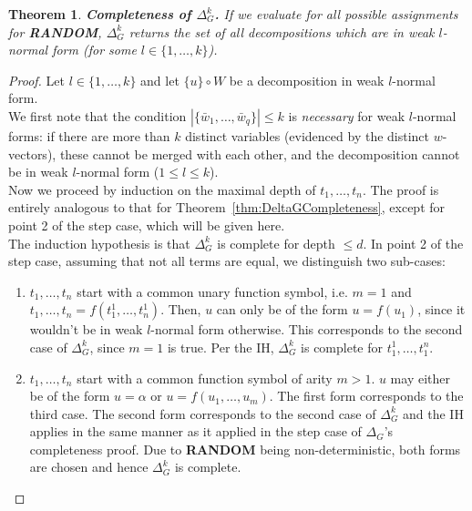 \documentclass[a4paper, 11pt]{report}
\newtheorem{theorem}{Theorem}
\begin{document}
\begin{theorem}
\textbf{Completeness of $\Delta_G^k$.}
If we evaluate for all possible assignments for \textbf{RANDOM}, $\Delta_G^k$ returns the set of all decompositions which are in weak $l$-normal form (for some $l \in \{1,\dots,k\}$).
\label{thm:DeltaGkCompletenss}
\end{theorem}

\begin{proof}
Let $l \in \{1,\dots,k\}$ and let $\{u\} \circ W$ be a decomposition in weak $l$-normal form.\\

We first note that the condition $|\{\bar{w}_1,\dots,\bar{w}_q\}| \leq k$ is {\em necessary} for weak $l$-normal forms: if there are more than $k$ distinct variables (evidenced by the distinct $w$-vectors), these cannot be merged with each other, and the decomposition cannot be in weak $l$-normal form ($1 \leq l \leq k$).\\

Now we proceed by induction on the maximal depth of $t_1,\dots,t_n$. The proof is entirely analogous to that for Theorem~\ref{thm:DeltaGCompleteness}, except for point 2 of the step case, which will be given here.\\

\noindent
The induction hypothesis is that $\Delta_G^k$ is complete for depth $\leq d$. In point 2 of the step case, assuming that not all terms are equal, we distinguish two sub-cases:
  \begin{enumerate}
    \item $t_1,\dots,t_n $ start with a common unary function symbol, i.e. $m = 1$ and $t_1,\dots,t_n = f(t_1^1,\dots,t_n^1)$. Then, $u$ can only be of the form $u=f(u_1)$, since it wouldn't be in weak $l$-normal form otherwise.
    This corresponds to the second case of $\Delta_G^k$, since $m = 1$ is true. Per the IH, $\Delta_G^k$ is complete for $t_1^1,\dots,t_1^n$.
    \item $t_1,\dots,t_n$ start with a common function symbol of arity $m > 1$. $u$ may either be of the form $u=\alpha$ or $u=f(u_1,\dots,u_m)$. The first form corresponds to the third case. The second form corresponds to the second case of $\Delta_G^k$ and the IH applies in the same manner as it applied in the step case of $\Delta_G$'s completeness proof. Due to \textbf{RANDOM} being non-deterministic, both forms are chosen and hence $\Delta_G^k$ is complete.
  \end{enumerate}
\end{proof}
\end{document}
